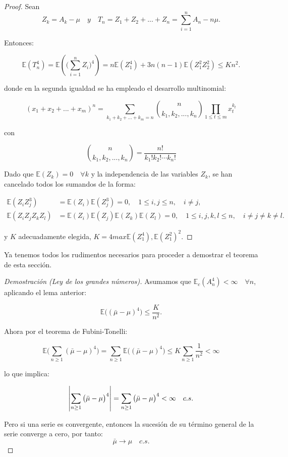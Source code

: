 \documentclass[../proyecto.tex]{memoir}
\begin{document}
\begin{proof}

Sean 
$$
Z_k = A_k - \mu \quad y \quad T_n = Z_1 + Z_2 + ... + Z_n = \sum_{i=1}^{n} A_n - n\mu. 
$$

Entonces:

$$
	\mathds{E} ( T_{n}^{4} ) = \mathds{E} ( \big( \sum_{i=1}^{n} Z_i \big) ^{4} ) = n\mathds{E}(Z_{1}^4)+3n(n-1)\mathds{E}(Z_1^2 Z_2^2) \leq Kn^2.
$$

donde en la segunda igualdad se ha empleado el desarrollo multinomial:

$$
(x_1+x_2+...+x_m)^n = \sum_{k_1+k_2+...+k_m=n} { n \choose k_1,k_2, ..., k_n} \prod_{1 \leq t \leq m} x_t^{k_t}
$$

con

$$
{ n \choose k_1,k_2, ..., k_n} = \frac{n!}{k_1!k_2! \dotsb k_n!}
$$

Dado que $\mathds{E}(Z_k)=0 \quad \forall k$ y la independencia de las variables $Z_k$, se han cancelado todos los sumandos de la forma:

\begin{align*}
	\mathds{E} (Z_{i} Z_{j}^3 ) &=\mathds{E} (Z_{i}) \mathds{E} (Z_{j}^3) = 0, \quad 1 \leq i,j \leq n, \quad i \neq j, \\
	\mathds{E} ( Z_{i} Z_{j} Z_{k} Z_{l} ) &= \mathds{E} (Z_{i}) \mathds{E} (Z_{j}) \mathds{E} (Z_{k}) \mathds{E} (Z_{l}) = 0, \quad 1 \leq i,j,k,l \leq n, \quad i \neq j \neq k \neq l.
\end{align*}

y $K$ adecuadamente elegida, $K = 4 max{\mathds{E}(Z_1^4), \mathds{E}(Z_1^2)^2}$.
\end{proof}

Ya tenemos todos los rudimentos necesarios para proceder a demostrar el teorema de esta sección.

\begin{proof}[Demostración (Ley de los grandes números)]

Asumamos que $\mathds{E}_c( A_n^4) < \infty \quad \forall n$, aplicando el lema anterior:

$$
	\mathds{E} \big( ( \bar{ \mu } - \mu ) ^ 4 \big) \leq \frac{K}{n^{2}}.
$$

Ahora por el teorema de Fubini-Tonelli:

$$
	\mathds{E} \big( \sum_{n \geq 1}( \bar{ \mu } - \mu ) ^ 4 \big) = \sum_{n \geq 1} \mathds{E} \big( ( \bar{ \mu } - \mu ) ^ 4 \big)  \leq K\sum_{n \geq 1}\frac{1}{n^{2}} < \infty
$$

lo que implica:

$$
\abs{ \sum_{n \geq 1} \big( \bar{ \mu } - \mu \big)^ 4 } = \sum_{n \geq 1} \big( \bar{ \mu } - \mu \big)^ 4 < \infty \quad c.s. 
$$

Pero si una serie es convergente, entonces la sucesión de su término general de la serie converge a cero, por tanto:
$$
 \bar{ \mu } \to \mu \quad c.s.
$$
\end{proof}
\end{document}
